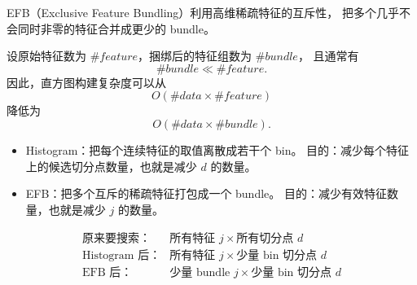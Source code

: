\begin{definition}
EFB（Exclusive Feature Bundling）利用高维稀疏特征的互斥性，
把多个几乎不会同时非零的特征合并成更少的 bundle。

设原始特征数为 $\#feature$，捆绑后的特征组数为 $\#bundle$，
且通常有
\[
\#bundle \ll \#feature.
\]
因此，直方图构建复杂度可以从
\[
O(\#data \times \#feature)
\]
降低为
\[
O(\#data \times \#bundle).
\]
\end{definition}
\begin{dxtips}
    \begin{itemize}
    \item Histogram：把每个连续特征的取值离散成若干个 bin。
    目的：减少每个特征上的候选切分点数量，也就是减少 $d$ 的数量。
    
    \item EFB：把多个互斥的稀疏特征打包成一个 bundle。
    目的：减少有效特征数量，也就是减少 $j$ 的数量。
\end{itemize}

\[
\begin{array}{ll}
\text{原来要搜索：} & \text{所有特征 } j \times \text{所有切分点 } d \\[4pt]
\text{Histogram 后：} & \text{所有特征 } j \times \text{少量 bin 切分点 } d \\[4pt]
\text{EFB 后：} & \text{少量 bundle } j \times \text{少量 bin 切分点 } d
\end{array}
\]
\end{dxtips}








